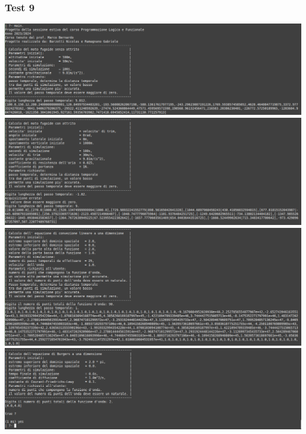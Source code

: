 \subsubsection*{Test 9}
\includegraphics[width=\textwidth,height=\textheight,keepaspectratio]{05_testing/image/pro/09_test/01.png}
\\
\includegraphics[width=\textwidth,height=\textheight,keepaspectratio]{05_testing/image/pro/09_test/02.png}
\\
\includegraphics[width=\textwidth,height=\textheight,keepaspectratio]{05_testing/image/pro/09_test/03.png}
\\
\includegraphics[width=\textwidth,height=\textheight,keepaspectratio]{05_testing/image/pro/09_test/04.png}

